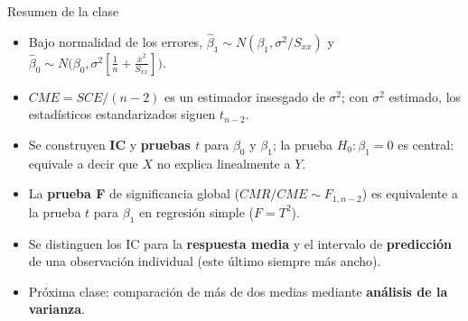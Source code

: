 \documentclass[aspectratio=169,11pt]{beamer}
\begin{document}
\begin{frame}{Resumen de la clase}
\begin{itemize}
\item Bajo normalidad de los errores, $\hat\beta_1\sim N(\beta_1,\sigma^2/S_{xx})$ y $\hat\beta_0\sim N\big(\beta_0,\sigma^2[\frac1n+\frac{\bar x^2}{S_{xx}}]\big)$.
\item $CME=SCE/(n-2)$ es un estimador insesgado de $\sigma^2$; con $\sigma^2$ estimado, los estadísticos estandarizados siguen $t_{n-2}$.
\item Se construyen \textbf{IC} y \textbf{pruebas $t$} para $\beta_0$ y $\beta_1$; la prueba $H_0:\beta_1=0$ es central: equivale a decir que $X$ no explica linealmente a $Y$.
\item La \textbf{prueba F} de significancia global ($CMR/CME\sim F_{1,n-2}$) es equivalente a la prueba $t$ para $\beta_1$ en regresión simple ($F=T^2$).
\item Se distinguen los IC para la \textbf{respuesta media} y el intervalo de \textbf{predicción} de una observación individual (este último siempre más ancho).
\item Próxima clase: comparación de más de dos medias mediante \textbf{análisis de la varianza}.
\end{itemize}
\end{frame}
\end{document}
